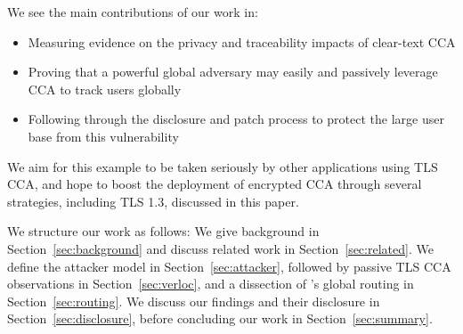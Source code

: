 We see the main contributions of our work in:
\begin{itemize}
	\item Measuring evidence on the privacy and traceability impacts of clear-text CCA
	\item Proving that a powerful global adversary may easily and passively leverage CCA to track users globally
	\item Following through the disclosure and patch process to protect the large {\apns} user base from this vulnerability
\end{itemize}
We aim for this example to be taken seriously by other applications using TLS CCA, and hope to boost the deployment of encrypted CCA through several strategies, including TLS 1.3, discussed in this paper. 

We structure our work as follows: 
We give background in Section~\ref{sec:background} and discuss related work in Section~\ref{sec:related}.
We define the attacker model in Section~\ref{sec:attacker}, followed by passive TLS CCA observations in Section~\ref{sec:verloc}, and a dissection of {\apns}'s global routing in Section~\ref{sec:routing}. 
We discuss our findings and their disclosure in Section~\ref{sec:disclosure}, before concluding our work in Section~\ref{sec:summary}.
